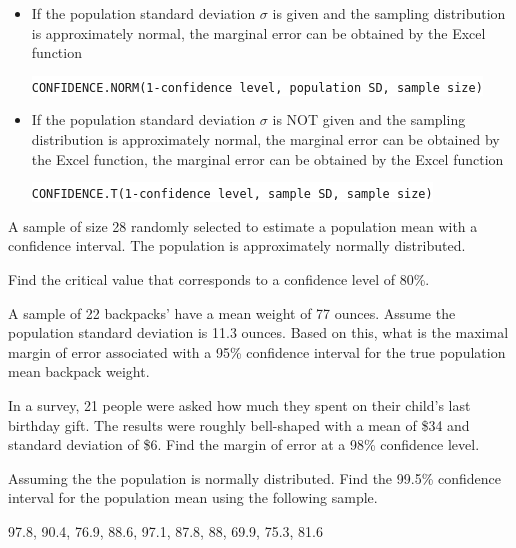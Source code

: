 \begin{itemize}
\item
  If the population standard deviation \(\sigma\) is given and the
  sampling distribution is approximately normal, the marginal error can be obtained by the Excel function\\
  \begin{fullwidth}
    \colorbox{white}{
      \texttt{CONFIDENCE.NORM(1-confidence\ level,\ population\ SD,\ sample\ size)}
    }
  \end{fullwidth}
\item
  If the population standard deviation \(\sigma\) is NOT given and the
  sampling distribution is approximately normal, the marginal error can
  be obtained by the Excel function, the marginal error can be obtained by the Excel function

  \begin{fullwidth}
    \colorbox{white}{
      \texttt{CONFIDENCE.T(1-confidence\ level,\ sample\ SD,\ sample\ size)}
    }
  \end{fullwidth}
\end{itemize}

\begin{exercise}

A sample of size 28 randomly selected to estimate a population mean with
a confidence interval. The population is approximately normally
distributed.

Find the critical value that corresponds to a confidence level of 80\%.

\end{exercise}
\vspace*{6\baselineskip}

\begin{exercise}

A sample of 22 backpacks' have a mean weight of 77 ounces. Assume the
population standard deviation is 11.3 ounces. Based on this, what is the
maximal margin of error associated with a 95\% confidence interval for
the true population mean backpack weight.

\end{exercise}
\vspace*{6\baselineskip}

\begin{exercise}

In a survey, 21 people were asked how much they spent on their child's
last birthday gift. The results were roughly bell-shaped with a mean of
\$34 and standard deviation of \$6. Find the margin of error at a 98\%
confidence level.

\end{exercise}
\vspace*{6\baselineskip}

\begin{exercise}

Assuming the the population is normally distributed. Find the 99.5\%
confidence interval for the population mean using the following sample.

97.8, 90.4, 76.9, 88.6, 97.1, 87.8, 88, 69.9, 75.3, 81.6

\end{exercise}
\vspace*{6\baselineskip}

